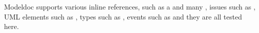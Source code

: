 Modeldoc supports various inline references, such as a  and many ,
issues such as ,
UML elements such as ,
types such as ,
events such as 
and they are all tested here.